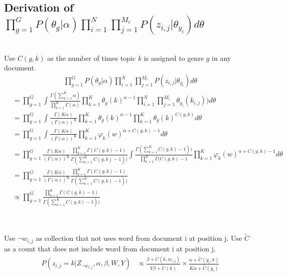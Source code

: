 \documentclass{article} %
\begin{document}
\begin{mdframed}
\subsection{Derivation of $\prod\limits_{g=1}^G P(\theta_g|\alpha) \prod^N_{i=1}\prod^{M_i}_{j=1} P(z_{i,j}|\theta_{y_i}) d\theta$}
~\\Use $C(g,k)$ as the number of times topic $k$ is assigned to genre $g$ in any document.
\begin{align}
\prod\limits_{g=1}^G P(\theta_g|\alpha) \prod^N_{i=1}\prod^{M_i}_{j=1} P(z_{i,j}|\theta_{y_i}) d\theta
\end{align}
\begin{align}
&= \prod\limits_{g=1}^G \int\frac{\Gamma (\sum\limits_{k=1}^K \alpha)}{\prod\limits_{k=1}^K \Gamma(\alpha)} \prod\limits_{k=1}^K  \theta_{g}(k)^{\alpha-1}  \prod^N_{i=1}\prod^{M_i}_{j=1} \theta_{y_{i}}(k_{i,j})) d\theta\\
&= \prod\limits_{g=1}^G \int \frac{\Gamma (K \alpha)}{(\Gamma(\alpha))^K} \prod\limits_{k=1}^K  \theta_{g}(k)^{\alpha-1}  \prod\limits_{k=1}^K \theta_g(k)^{C(g,k)} d\theta\\
&= \prod\limits_{g=1}^G \int \frac{\Gamma (K \alpha)}{(\Gamma(\alpha))^K}  \prod\limits_{k=1}^K \varphi_{k}(w)^{\alpha + C(g,k) -1} d\theta\\
&= \prod\limits_{g=1}^G  \frac{\Gamma (K \alpha)}{(\Gamma(\alpha))^K}  \frac{\prod\limits_{k=1}^K \Gamma(C(g,k)-1)}{\Gamma(\sum\limits_{k=1}^K C(g,k)-1))} \int \frac{\Gamma(\sum\limits_{k=1}^K C(g,k)-1))}{\prod\limits_{k=1}^K \Gamma(C(g,k)-1}  \prod\limits_{k=1}^K \varphi_{k}(w)^{\alpha + C(g,k) -1} d\theta\\
&=  \prod\limits_{g=1}^G  \frac{\Gamma (K \alpha)}{(\Gamma(\alpha))^K}  \frac{\prod\limits_{k=1}^K \Gamma(C(g,k)-1)}{\Gamma(\sum\limits_{k=1}^K C(g,k)-1))} \\
&\propto  \prod\limits_{g=1}^G   \frac{\prod\limits_{k=1}^K \Gamma(C(g,k)-1)}{\Gamma(\sum\limits_{k=1}^K C(g,k)-1))} 
\end{align}

\subsection{}
~\\ Use $\neg w_{i,j}$ as collection that not uses word from document i at position j. Use $\widetilde{C}$ as a count that does not include word from document i at position j.
\begin{align}
P(z_{i,j} = k | Z_{\neg w_{i,j}}, \alpha, \beta, W, Y) &\propto \frac{\beta + \widetilde{C}(k, w_{i,j})}{V\beta + \widetilde{C}(k)} \times \frac{\alpha + \widetilde{C}(y_i, k)}{K\alpha + \widetilde{C}(y_i)}
\end{align}
\end{mdframed}
\end{document}
